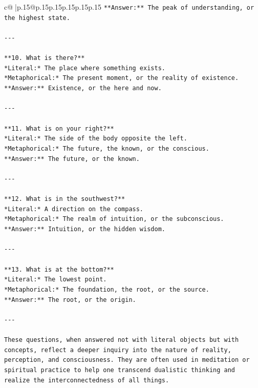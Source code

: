 \documentclass{article}
\begin{document}
{\begin{supertabular}{c@{$\;$}|p{.15\linewidth}@{}p{.15\linewidth}p{.15\linewidth}p{.15\linewidth}p{.15\linewidth}p{.15\linewidth}}
{{{\texttt{**Answer:** The peak of understanding, or the highest state.} \\
\\ 
\texttt{{-}{-}{-}} \\
\\ 
\texttt{**10. What is there?**  } \\
\texttt{*Literal:* The place where something exists.  } \\
\texttt{*Metaphorical:* The present moment, or the reality of existence.  } \\
\texttt{**Answer:** Existence, or the here and now.} \\
\\ 
\texttt{{-}{-}{-}} \\
\\ 
\texttt{**11. What is on your right?**  } \\
\texttt{*Literal:* The side of the body opposite the left.  } \\
\texttt{*Metaphorical:* The future, the known, or the conscious.  } \\
\texttt{**Answer:** The future, or the known.} \\
\\ 
\texttt{{-}{-}{-}} \\
\\ 
\texttt{**12. What is in the southwest?**  } \\
\texttt{*Literal:* A direction on the compass.  } \\
\texttt{*Metaphorical:* The realm of intuition, or the subconscious.  } \\
\texttt{**Answer:** Intuition, or the hidden wisdom.} \\
\\ 
\texttt{{-}{-}{-}} \\
\\ 
\texttt{**13. What is at the bottom?**  } \\
\texttt{*Literal:* The lowest point.  } \\
\texttt{*Metaphorical:* The foundation, the root, or the source.  } \\
\texttt{**Answer:** The root, or the origin.} \\
\\ 
\texttt{{-}{-}{-}} \\
\\ 
\texttt{These questions, when answered not with literal objects but with concepts, reflect a deeper inquiry into the nature of reality, perception, and consciousness. They are often used in meditation or spiritual practice to help one transcend dualistic thinking and realize the interconnectedness of all things.} \\
}}}
\end{supertabular}}
\end{document}
